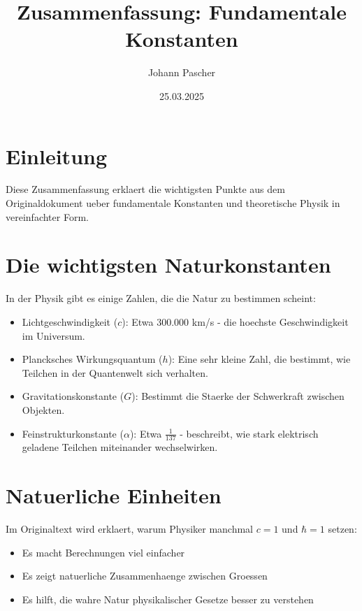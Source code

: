\documentclass{article}
\title{Zusammenfassung: Fundamentale Konstanten}
\author{Johann Pascher}
\date{25.03.2025}
\begin{document}
	\maketitle
	
	\section{Einleitung}
	
	Diese Zusammenfassung erklaert die wichtigsten Punkte aus dem Originaldokument ueber fundamentale Konstanten und theoretische Physik in vereinfachter Form.
	
	\section{Die wichtigsten Naturkonstanten}
	
	In der Physik gibt es einige Zahlen, die die Natur zu bestimmen scheint:
	
	\begin{itemize}
		\item Lichtgeschwindigkeit ($c$): Etwa 300.000 km/s - die hoechste Geschwindigkeit im Universum.
		
		\item Plancksches Wirkungsquantum ($h$): Eine sehr kleine Zahl, die bestimmt, wie Teilchen in der Quantenwelt sich verhalten.
		
		\item Gravitationskonstante ($G$): Bestimmt die Staerke der Schwerkraft zwischen Objekten.
		
		\item Feinstrukturkonstante ($\alpha$): Etwa $\frac{1}{137}$ - beschreibt, wie stark elektrisch geladene Teilchen miteinander wechselwirken.
	\end{itemize}
	
	\section{Natuerliche Einheiten}
	
	Im Originaltext wird erklaert, warum Physiker manchmal $c = 1$ und $\hbar = 1$ setzen:
	
	\begin{itemize}
		\item Es macht Berechnungen viel einfacher
		\item Es zeigt natuerliche Zusammenhaenge zwischen Groessen
		\item Es hilft, die wahre Natur physikalischer Gesetze besser zu verstehen
	\end{itemize}
	
\end{document}
